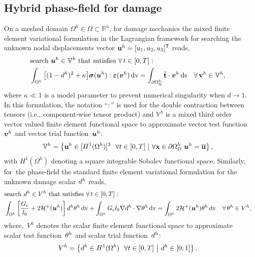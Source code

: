 {{\subsection{Hybrid phase-field for damage}
On a meshed domain $\Omega^h\in\Omega\subset\mathbb{R}^n$, for damage mechanics the mixed finite element variational formulation in the Lagrangian framework for searching the unknown nodal displacements vector ${\bf{u}}^h=[u_1,u_2,u_3]^\mathsf{T}$ reads,
%
%
\begin{equation}\label{Eq:VarfU}
\begin{aligned}
&\text{search}~\boldsymbol u^h\in\mathbb{V}^h \text{~that satisfies}~\forall\, t\in[0,T]:\\
&\int_{\Omega^h}\big[(1-d^h)^2 + \kappa \big]\boldsymbol{\sigma}(\boldsymbol u^h) : \boldsymbol{\varepsilon}(\boldsymbol v^h) \,\mathrm{d}\text{v}= \int_{\partial\Omega^h_\text{N}} \overline{{\bf t}}\cdot\boldsymbol v^h \,\mathrm{d}\text{s} \quad\forall\,{\bf{v}}^h\in\mathbb{V}^h,
\end{aligned}
\end{equation}
where $\kappa\ll1$ is a model parameter to prevent numerical singularity when $d \to 1$.
In this formulation, the notation ``$:$'' is used for the double contraction between tensors (i.e., component-wise tensor product) and $ \mathbb{V}^h $ is a  mixed third order vector valued finite element functional space to approximate vector test function~$\boldsymbol v^h$ and vector trial function~$\boldsymbol u^h$:
\begin{equation}
\mathbb{V}^h=\left\{ {\bf{u}}^h\in [ {H}^1(\Omega^h) ]^3~~\forall t\in[0,T]~|~ \forall {\bf{x}}\in\partial\Omega^h_{\text{D}}~\boldsymbol u^h=\overline{{\bf{u}}}\right\},
\end{equation}
%
with ${H}^1(\Omega^h)$ denoting a square integrable Sobolev functional space.
Similarly, for~the phase-field the standard finite element variational formulation for the unknown damage scalar $d^h$ reads, 
%
%
\begin{equation}
\begin{aligned}\label{Eq:VarfPhi}
&\text{search}~d^h\in{{V}}^h \text{~that satisfies}~\forall\, t\in[0,T]:\\
&\int_{\Omega^h}\left[ \frac{G_{\text{c}}}{l_0} + 2 \mathcal{H}^{+}(\boldsymbol u^h) \right]d^h\theta^h\, \mathrm{d}\text{v} + \int_{\Omega^h} {G_{\text{c}}}{l_0}\nabla d^h \cdot \nabla\theta^h \, \mathrm{d}\text{v}= \int_{\Omega^h} 2\mathcal{H}^{+}(\boldsymbol u^h)\theta^h \, \mathrm{d}\text{v}\quad\forall\,\theta^h\in{{V}}^h, 
\end{aligned}
\end{equation}
%
%
where,~${{V}}^h$ denotes the scalar finite element functional space to approximate scalar test function~$\theta^h$ and scalar trial function~$d^h$:
\begin{equation}
{{V}}^h=\left\{d^h \in  {H}^1(\Omega^h)~~\forall t\in[0,T]~\middle|~d^h\in[0,1]  \right\}.
\end{equation}


}}
